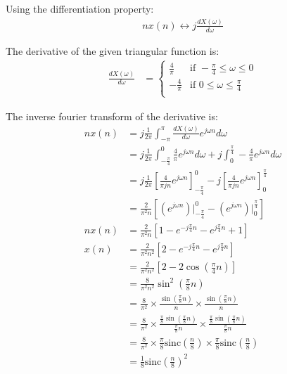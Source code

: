 \documentclass{article}
\begin{document}
Using the differentiation property:
\begin{align*}
    nx(n) \leftrightarrow j \frac{dX(\omega)}{d\omega}
\end{align*}

The derivative of the given triangular function is:
\begin{align*}
    \frac{dX(\omega)}{d\omega} &= \begin{cases}
        \frac{4}{\pi} & \text{if } -\frac{\pi}{4} \leq \omega \leq 0 \\
        -\frac{4}{\pi} & \text{if } 0 \leq \omega \leq \frac{\pi}{4} \\
    \end{cases}
\end{align*}

The inverse fourier transform of the derivative is:
\begin{align*}
    nx(n) &= j \frac{1}{2\pi} \int_{-\pi}^{\pi} \frac{dX(\omega)}{d\omega} e^{j \omega n} d\omega \\
    &= j \frac{1}{2\pi}\int_{-\frac{\pi}{4}}^{0} \frac{4}{\pi} e^{j \omega n} d\omega + j \int_{0}^{\frac{\pi}{4}} -\frac{4}{\pi} e^{j \omega n} d\omega \\
    &= j \frac{1}{2\pi}\left[ \frac{4}{\pi jn} e^{j \omega n} \right]_{-\frac{\pi}{4}}^{0} - j \left[ \frac{4}{\pi jn} e^{j \omega n} \right]_{0}^{\frac{\pi}{4}} \\
    &= \frac{2}{\pi^2 n} \left[ \left(e^{j\omega n}\right)\Bigg|_{-\frac{\pi}{4}}^{0} - \left(e^{j\omega n}\right)\Bigg|_{0}^{\frac{\pi}{4}} \right] \\
    nx(n) &= \frac{2}{\pi^2 n} \left[ 1 - e^{-j\frac{\pi}{4} n} - e^{j\frac{\pi}{4} n} + 1 \right] \\
    x(n)&= \frac{2}{\pi^2 n^2} \left[ 2 - e^{-j\frac{\pi}{4} n} - e^{j\frac{\pi}{4} n} \right] \\
    &= \frac{2}{\pi^2 n^2} \left[2 - 2\cos\left(\frac{\pi}{4}n\right)\right] \\
    &= \frac{8}{\pi^2 n^2} \sin^2\left(\frac{\pi}{8}n\right) \\
    &= \frac{8}{\pi^2} \times \frac{\sin\left(\frac{\pi}{8}n\right)}{n} \times \frac{\sin\left(\frac{\pi}{8}n\right)}{n} \\
    &= \frac{8}{\pi^2}  \times \frac{\frac{\pi}{8} \sin\left(\frac{\pi}{8}n\right)}{\frac{\pi}{8}n} \times \frac{\frac{\pi}{8} \sin\left(\frac{\pi}{8}n\right)}{\frac{\pi}{8}n} \\
    &= \frac{8}{\pi^2}  \times \frac{\pi}{8} \text{sinc}\left(\frac{n}{8}\right) \times \frac{\pi}{8} \text{sinc}\left(\frac{n}{8}\right) \\
    &= \boxed{\frac{1}{8}\text{sinc}\left(\frac{n}{8}\right)^2}
\end{align*}
\end{document}
